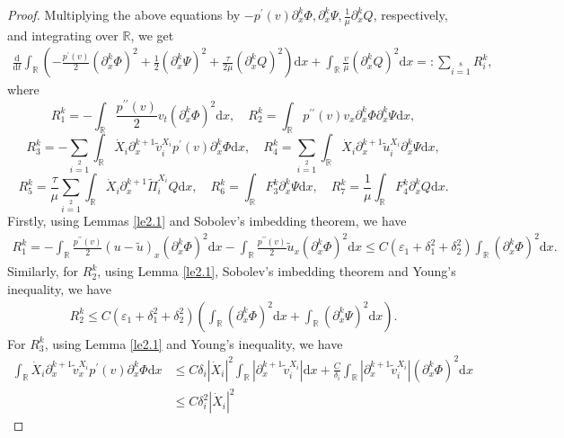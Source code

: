 \documentclass[10pt,reqno]{amsart}
\numberwithin{equation}{section}
\newcommand{\dif}{\mathrm{d}}
\begin{document}
\begin{proof}
Multiplying the above equations by $-p^{\prime}(v)\partial_{x}^k\Phi,\partial_{x}^k\Psi,\frac{1}{\mu}\partial_{x}^kQ$, respectively, and integrating over $\mathbb{R}$, we get
\begin{align}\label{4.11}
  \frac{\dif}{\dif t}\int_\mathbb{R}\left(-\frac{p^{\prime}(v)}{2}(\partial_{x}^k\Phi)^2
  +\frac{1}{2}(\partial_{x}^k\Psi)^2
  +\frac{\tau}{2\mu}(\partial_{x}^kQ)^2\right)\dif x
   +\int_\mathbb{R}\frac{v}{\mu}(\partial_x^kQ)^2\dif x
    =:\sum\limits_{i=1}\limits^{8}R^k_i,
\end{align}
where
\[
R^k_1=-\int_\mathbb{R}\frac{p^{\prime\prime}(v)}{2}v_t(\partial_{x}^k\Phi)^2\dif x, \quad
R^k_2=\int_\mathbb{R}p^{\prime\prime}(v)v_{x}\partial_{x}^k\Phi\partial_{x}^k\Psi \dif x,
\]
\[
R^k_3=-\sum\limits_{i=1}\limits^2
\int_\mathbb{R}\dot{X}_i\partial_{x}^{k+1}\widetilde{v}^{X_i}_ip^{\prime}(v)\partial_{x}^k\Phi \dif x,
\quad
R^k_4=\sum\limits_{i=1}\limits^2
\int_\mathbb{R}\dot{X}_i\partial_{x}^{k+1}\widetilde{u}^{X_i}_i\partial_{x}^k\Psi \dif x,
\]
\[
R^k_5=\frac{\tau}{\mu}\sum\limits_{i=1}\limits^2
\int_\mathbb{R}\dot{X}_i\partial_{x}^{k+1}\widetilde{\Pi}^{X_i}_iQ\dif x,\quad
R^k_6=\int_\mathbb{R}F_3^k\partial_{x}^k\Psi \dif x,\quad
R^k_7=\frac{1}{\mu}\int_\mathbb{R}F_4^k\partial_{x}^kQ\dif x.
\]
Firstly, using Lemmas \ref{le2.1} and Sobolev's imbedding theorem, we have
\begin{align*}
R^k_1=-\int_\mathbb{R}\frac{p^{\prime\prime}(v)}{2}(u-\widetilde{u})_x(\partial_{x}^k\Phi)^2\dif x
-\int_\mathbb{R}\frac{p^{\prime\prime}(v)}{2}\widetilde{u}_x(\partial_{x}^k\Phi)^2\dif x
\le C(\varepsilon_1+\delta_1^2+\delta_2^2)\int_\mathbb{R}(\partial_{x}^k\Phi)^2\dif x.
\end{align*}
Similarly, for $R^k_2$, using Lemma \ref{le2.1}, Sobolev's imbedding theorem and Young's inequality, we have
\begin{align*}
R^k_2\le C(\varepsilon_1+\delta_1^2+\delta_2^2)\left(\int_\mathbb{R}(\partial_{x}^k\Phi)^2\dif x
+\int_\mathbb{R}(\partial_{x}^k\Psi)^2\dif x\right).
\end{align*}
For $R^k_3$, using Lemma \ref{le2.1} and Young's inequality, we have
\begin{align*}
\int_\mathbb{R}\dot{X}_i\partial_{x}^{k+1}\widetilde{v}^{X_i}_xp^{\prime}(v)\partial_{x}^k\Phi \dif x
&\le C\delta_i|\dot{X}_i|^2\int_\mathbb{R}|\partial_{x}^{k+1}\widetilde{v}^{X_i}_i|\dif x
+\frac{C}{\delta_i}\int_\mathbb{R}|\partial_{x}^{k+1}\widetilde{v}^{X_i}_i|(\partial_{x}^k\Phi)^2 \dif x\\
&\le C\delta_i^2|\dot{X}_i|^2

\end{align*}
\end{proof}
\end{document}
